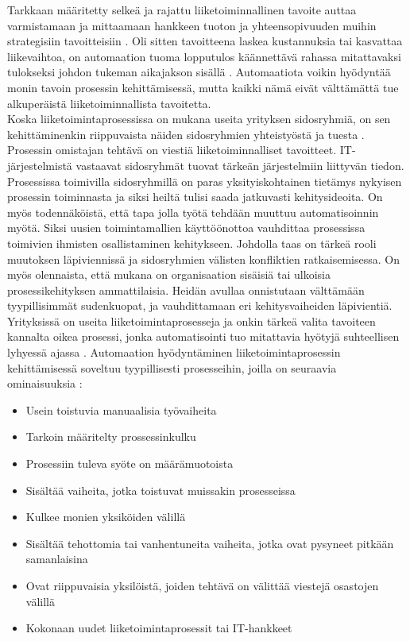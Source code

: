 \documentclass[finnish,12pt,a4paper,pdftex]{article}
\begin{document}
Tarkkaan määritetty selkeä ja rajattu liiketoiminnallinen tavoite auttaa varmistamaan ja mittaamaan hankkeen tuoton ja yhteensopivuuden muihin strategisiin tavoitteisiin \citep{mohapatra}. Oli sitten tavoitteena laskea kustannuksia tai kasvattaa liikevaihtoa, on automaation tuoma lopputulos käännettävä rahassa mitattavaksi tulokseksi johdon tukeman aikajakson sisällä \citep{clarkin}. Automaatiota voikin hyödyntää monin tavoin prosessin kehittämisessä, mutta kaikki nämä eivät välttämättä tue alkuperäistä liiketoiminnallista tavoitetta.\\

Koska liiketoimintaprosessissa on mukana useita yrityksen sidosryhmiä, on sen kehittäminenkin riippuvaista näiden sidosryhmien yhteistyöstä ja tuesta \citep{clarkin, mohapatra}. Prosessin omistajan tehtävä on viestiä liiketoiminnalliset tavoitteet. IT-järjestelmistä vastaavat sidosryhmät tuovat tärkeän järjestelmiin liittyvän tiedon. Prosessissa toimivilla sidosryhmillä on paras yksityiskohtainen tietämys nykyisen prosessin toiminnasta ja siksi heiltä tulisi saada jatkuvasti kehitysideoita. On myös todennäköistä, että tapa jolla työtä tehdään muuttuu automatisoinnin myötä. Siksi uusien toimintamallien käyttöönottoa vauhdittaa prosessissa toimivien ihmisten osallistaminen kehitykseen. Johdolla taas on tärkeä rooli muutoksen läpiviennissä ja sidosryhmien välisten konfliktien ratkaisemisessa. On myös olennaista, että mukana on organisaation sisäisiä tai ulkoisia prosessikehityksen ammattilaisia. Heidän avullaa onnistutaan välttämään tyypillisimmät sudenkuopat, ja vauhdittamaan eri kehitysvaiheiden läpivientiä.\\

Yrityksissä on useita liiketoimintaprosesseja ja onkin tärkeä valita tavoiteen kannalta oikea prosessi, jonka automatisointi tuo mitattavia hyötyjä suhteellisen lyhyessä ajassa \citep{mohapatra}. Automaation hyödyntäminen liiketoimintaprosessin kehittämisessä soveltuu tyypillisesti prosesseihin, joilla on seuraavia ominaisuuksia \citep{clarkin, mohapatra}:

\begin{itemize}
\setlength{\itemsep}{0pt}
    \item Usein toistuvia manuaalisia työvaiheita
    \item Tarkoin määritelty prossessinkulku
    \item Prosessiin tuleva syöte on määrämuotoista
    \item Sisältää vaiheita, jotka toistuvat muissakin prosesseissa
    \item Kulkee monien yksiköiden välillä
    \item Sisältää tehottomia tai vanhentuneita vaiheita, jotka ovat pysyneet pitkään samanlaisina
    \item Ovat riippuvaisia yksilöistä, joiden tehtävä on välittää viestejä osastojen välillä
    \item Kokonaan uudet liiketoimintaprosessit tai IT-hankkeet
\end{itemize}
\end{document}
